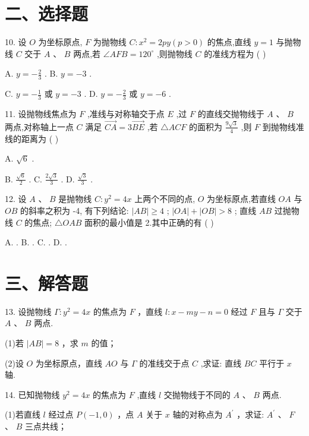 \section*{二、选择题}

10. 设 $O$ 为坐标原点, $F$ 为抛物线 $C : {x}^{2} = {2py}\left( {p > 0}\right)$ 的焦点,直线 $y = 1$ 与抛物线 $C$ 交于 $A\text{ 、 }B$ 两点,若 $\angle {AFB} = {120}^{ \circ  }$ ,则抛物线 $C$ 的准线方程为 ( )

A. $y =  - \frac{2}{3}$ . B. $y =  - 3$ .

C. $y =  - \frac{1}{3}$ 或 $y =  - 3$ . D. $y =  - \frac{2}{3}$ 或 $y =  - 6$ .

11. 设抛物线焦点为 $F$ ,准线与对称轴交于点 $E$ ,过 $F$ 的直线交抛物线于 $A\text{ 、 }B$ 两点,对称轴上一点 $C$ 满足 $\overrightarrow{CA} = 3\overrightarrow{BE}$ ,若 $\bigtriangleup {ACF}$ 的面积为 $\frac{9\sqrt{3}}{4}$ ,则 $F$ 到抛物线准线的距离为 ( )

A. $\sqrt{6}$ .

B. $\frac{\sqrt{6}}{2}$ . C. $\frac{2\sqrt{3}}{3}$ . D. $\frac{\sqrt{3}}{3}$ .

12. 设 $A\text{ 、 }B$ 是抛物线 $C : {y}^{2} = {4x}$ 上两个不同的点, $O$ 为坐标原点,若直线 ${OA}$ 与 ${OB}$ 的斜率之积为 -4, 有下列结论:    $\left| {AB}\right|  \geq  4$ ;    $\left| {OA}\right|  + \left| {OB}\right|  > 8$ ;    直线 ${AB}$ 过抛物线 $C$ 的焦点;    $\bigtriangleup {OAB}$ 面积的最小值是 2.其中正确的有 ( )

A.       . B.       . C.       . D.         .

\section*{三、解答题}

13. 设抛物线 $\Gamma  : {y}^{2} = {4x}$ 的焦点为 $F$ ，直线 $l : x - {my} - n = 0$ 经过 $F$ 且与 $\Gamma$ 交于 $A$ 、 $B$ 两点.

(1)若 $\left| {AB}\right|  = 8$ ，求 $m$ 的值；

(2)设 $O$ 为坐标原点，直线 ${AO}$ 与 $\Gamma$ 的准线交于点 $C$ ,求证: 直线 ${BC}$ 平行于 $x$ 轴.

14. 已知抛物线 ${y}^{2} = {4x}$ 的焦点为 $F$ ,直线 $l$ 交抛物线于不同的 $A$ 、 $B$ 两点.

(1)若直线 $l$ 经过点 $P\left( {-1,0}\right)$ ，点 $A$ 关于 $x$ 轴的对称点为 ${A}^{\prime }$ ，求证: ${A}^{\prime }$ 、 $F$ 、 $B$ 三点共线；

